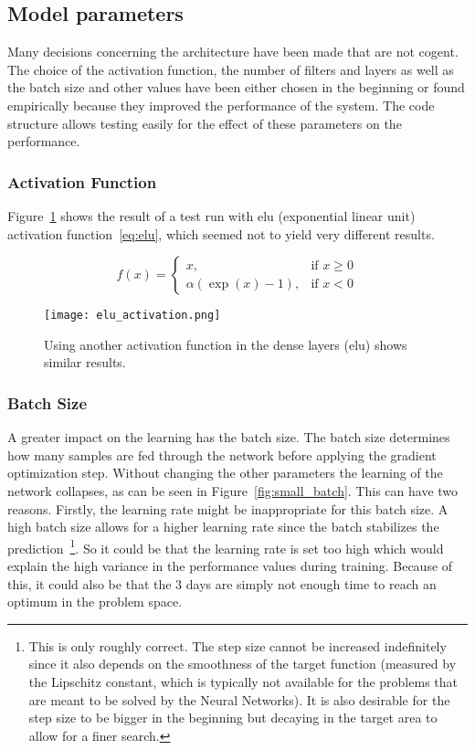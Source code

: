 \documentclass[main.tex]{subfiles}
\begin{document}
\subsection{Model parameters}
Many decisions concerning the architecture have been made that are not cogent. The choice of the activation function, the number of filters and layers as well as the batch size and other values have been either chosen in the beginning or found empirically because they improved the performance of the system. The code structure allows testing easily for the effect of these parameters on the performance. 

\subsubsection{Activation Function}

Figure~\ref{fig:other_act} shows the result of a test run with elu (exponential linear unit) activation function~\ref{eq:elu}, which seemed not to yield very different results.

\begin{equation} \label{eq:elu}
f(x)= \begin{cases}
    x,& \text{if } x\geq 0\\
    \alpha\left(\exp(x) - 1\right), & \text{if } x < 0
    \end{cases}
\end{equation}

\begin{figure}
\begin{center}
\texttt{[image: elu\_activation.png]}
\end{center}
\caption{Using another activation function in the dense layers (elu) shows similar results.}
\label{fig:other_act}
\end{figure}

\subsubsection{Batch Size}

A greater impact on the learning has the batch size. The batch size determines how many samples are fed through the network before applying the gradient optimization step. Without changing the other parameters the learning of the network collapses, as can be seen in Figure~\ref{fig:small_batch}. This can have two reasons. Firstly, the learning rate might be inappropriate for this batch size. A high batch size allows for a higher learning rate since the batch stabilizes the prediction~\footnote{This is only roughly correct. The step size cannot be increased indefinitely since it also depends on the smoothness of the target function (measured by the Lipschitz constant, which is typically not available for the problems that are meant to be solved by the Neural Networks). It is also desirable for the step size to be bigger in the beginning but decaying in the target area to allow for a finer search.}. So it could be that the learning rate is set too high which would explain the high variance in the performance values during training. Because of this, it could also be that the 3 days are simply not enough time to reach an optimum in the problem space.
\end{document}
